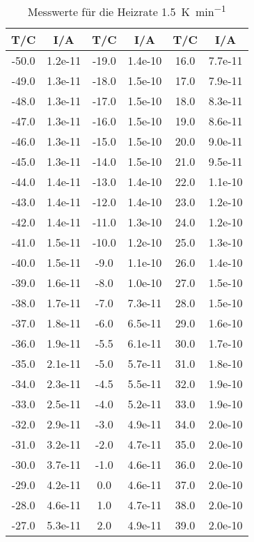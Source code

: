 \begin{table}
  \centering
  \caption{Messwerte für die Heizrate \SI{1.5}{\kelvin\per\minute}}
\begin{tabular}{cc|cc|cc}
        T/C & I/A &T/C  & I/A &T/C & I/A \\
\midrule
 -50.0 &  1.2e-11 & -19.0 & 1.4e-10 & 16.0 &  7.7e-11 \\
 -49.0 &  1.3e-11 & -18.0 & 1.5e-10 & 17.0 &  7.9e-11 \\
 -48.0 & 1.3e-11 &  -17.0 & 1.5e-10 & 18.0 &  8.3e-11 \\
 -47.0 & 1.3e-11 &  -16.0 & 1.5e-10 & 19.0 &  8.6e-11 \\
 -46.0 & 1.3e-11 &  -15.0 & 1.5e-10 & 20.0 &  9.0e-11 \\
 -45.0 & 1.3e-11 &  -14.0 & 1.5e-10 & 21.0 &  9.5e-11 \\
 -44.0 & 1.4e-11 &  -13.0 & 1.4e-10 & 22.0 &  1.1e-10 \\
 -43.0 & 1.4e-11 &  -12.0 & 1.4e-10 & 23.0 &  1.2e-10 \\
 -42.0 & 1.4e-11 &  -11.0 & 1.3e-10 & 24.0 &  1.2e-10 \\
 -41.0 & 1.5e-11 &  -10.0 & 1.2e-10 & 25.0 &  1.3e-10 \\
 -40.0 & 1.5e-11 &   -9.0 & 1.1e-10 & 26.0 &  1.4e-10 \\
 -39.0 & 1.6e-11 &   -8.0 & 1.0e-10 & 27.0 &  1.5e-10 \\
 -38.0 & 1.7e-11 &   -7.0 & 7.3e-11 & 28.0 &  1.5e-10 \\
 -37.0 & 1.8e-11 &   -6.0 & 6.5e-11 & 29.0 &  1.6e-10 \\
 -36.0 & 1.9e-11 &   -5.5 & 6.1e-11 & 30.0 &  1.7e-10 \\
 -35.0 & 2.1e-11 &   -5.0 & 5.7e-11 & 31.0 &  1.8e-10 \\
 -34.0 & 2.3e-11 &   -4.5 & 5.5e-11 & 32.0 &   1.9e-10 \\
 -33.0 & 2.5e-11 &   -4.0 & 5.2e-11 & 33.0 &   1.9e-10\\
 -32.0 & 2.9e-11 &   -3.0 & 4.9e-11 & 34.0 &  2.0e-10 \\
 -31.0 & 3.2e-11 &   -2.0 & 4.7e-11 & 35.0 &  2.0e-10 \\
 -30.0 & 3.7e-11 &   -1.0 & 4.6e-11 & 36.0 &  2.0e-10 \\
 -29.0 & 4.2e-11 &    0.0 & 4.6e-11 & 37.0 &  2.0e-10 \\
 -28.0 & 4.6e-11 &    1.0 & 4.7e-11 & 38.0 &  2.0e-10 \\
 -27.0 & 5.3e-11 &    2.0 & 4.9e-11 & 39.0 &  2.0e-10 \\

\end{tabular}
\end{table}
